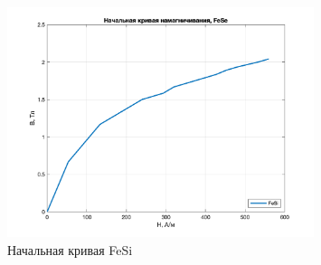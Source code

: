 \documentclass[a4paper, 12pt]{article}
\begin{document}
\begin{figure}[h]
    \centering
    \includegraphics[width=0.8\textwidth]{FeSi}
    \caption{Начальная кривая FeSi}
    \label{fig:FeSi}
\end{figure}
\end{document}
